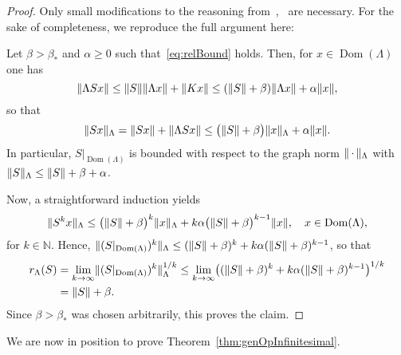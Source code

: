 \documentclass[11pt,a4paper]{amsart}
\numberwithin{equation}{section}
\DeclareMathOperator{\Dom}{Dom}
\DeclarePairedDelimiter{\norm}{\lVert}{\rVert}
\newcommand{\N}{\mathbb{N}}
\theoremstyle{plain}
\theoremstyle{definition}
\theoremstyle{remark}
\begin{document}
\begin{proof}
  Only small modifications to the reasoning from~\cite[Lemma~3.9]{SeelDiss},~\cite[Proposition~A.5]{NSTTV18} are necessary. For
  the sake of completeness, we reproduce the full argument here:
  
  Let $\beta > \beta_*$ and $\alpha \ge 0$ such that~\eqref{eq:relBound} holds. Then, for $x\in\Dom(\Lambda)$ one has
  \begin{equation*}%
   \norm{\Lambda Sx} \le \norm{S}\norm{\Lambda x} + \norm{Kx} \le (\norm{S}+\beta)\norm{\Lambda x} + \alpha\norm{x},
  \end{equation*}
  so that
  \begin{equation*}
    \norm{Sx}_\Lambda = \norm{Sx} + \norm{\Lambda Sx} \le \bigl(\norm{S}+\beta\bigr)\norm{x}_\Lambda + \alpha\norm{x}.
  \end{equation*}
  In particular, $S|_{\Dom(\Lambda)}$ is bounded with respect to the graph norm $\norm{\,\cdot\,}_\Lambda$ with
  $\norm{S}_\Lambda\le \norm{S} + \beta + \alpha$.

  Now, a straightforward induction yields
  \begin{equation*}
    \norm{S^kx}_\Lambda
    \le
    \bigl(\norm{S} + \beta\bigr)^k\norm{x}_\Lambda + k\alpha\bigl(\norm{S}+\beta\bigr)^{k-1}\norm{x},
    \quad x\in\Dom(\Lambda),
  \end{equation*}
  for $k\in\N$. Hence, $\norm{(S|_{\Dom(\Lambda)})^k}_\Lambda \le (\norm{S}+\beta)^k + k\alpha(\norm{S}+\beta)^{k-1}$, so that
  \begin{align*}
    r_\Lambda(S)
    &=
    \lim_{k\to\infty} \norm{(S|_{\Dom(\Lambda)})^k}_\Lambda^{1/k}
      \le
      \lim_{k\to\infty} \bigl( (\norm{S}+\beta)^k+k\alpha(\norm{S}+\beta)^{k-1} \bigr)^{1/k}\\
    &=
    \norm{S}+\beta
    .
  \end{align*}
  Since $\beta > \beta_*$ was chosen arbitrarily, this proves the claim.
\end{proof}%

We are now in position to prove Theorem~\ref{thm:genOpInfinitesimal}.
\end{document}

